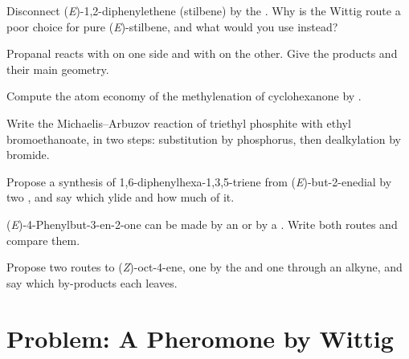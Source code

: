 \begin{exercise}[$\star\star$]\label{exo:b2:wittig:6}
Disconnect (\textit{E})-1,2-diphenylethene (stilbene) by the . Why is the Wittig route
a poor choice for pure (\textit{E})-stilbene, and what would you use instead?
\end{exercise}

\begin{exercise}[$\star\star$]\label{exo:b2:wittig:7}
Propanal reacts with  on one side and with  on the other. Give the
products and their main geometry.
\end{exercise}

\begin{exercise}[$\star\star$]\label{exo:b2:wittig:8}
Compute the atom economy of the methylenation of cyclohexanone by .
\end{exercise}

\begin{exercise}[$\star\star$]\label{exo:b2:wittig:9}
Write the Michaelis--Arbuzov reaction of triethyl phosphite with ethyl bromoethanoate, in two steps:
substitution by phosphorus, then dealkylation by bromide.
\end{exercise}

\begin{exercise}[$\star\star\star$]\label{exo:b2:wittig:10}
Propose a synthesis of 1,6-diphenylhexa-1,3,5-triene from (\textit{E})-but-2-enedial
 by two , and say which ylide and how much of it.
\end{exercise}

\begin{exercise}[$\star\star\star$]\label{exo:b2:wittig:11}
(\textit{E})-4-Phenylbut-3-en-2-one can be made by an  or by a .
Write both routes and compare them.
\end{exercise}

\begin{exercise}[$\star\star\star$]\label{exo:b2:wittig:12}
Propose two routes to (\textit{Z})-oct-4-ene, one by the  and one through an alkyne,
and say which by-products each leaves.
\end{exercise}

\section{Problem: A Pheromone by Wittig}

